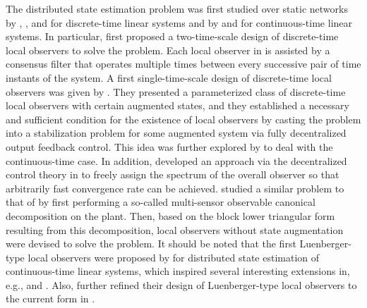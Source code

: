 \documentclass[twocolumn]{autart}
\begin{document}
The distributed state estimation problem was first studied over static networks
by \cite{Acikmese14}, \cite{ParkMartins17}, and \cite{MitraSundaram18} for discrete-time linear systems
and by \cite{KimShim16} and \cite{WangMorse18} for continuous-time linear systems.
In particular, \cite{Acikmese14} first proposed a two-time-scale design of discrete-time local observers to solve the problem.
Each local observer in \cite{Acikmese14} is assisted by a consensus filter
that operates multiple times between every successive pair of time instants of the system.
A first single-time-scale design of discrete-time local observers was given by \cite{ParkMartins17}.
They presented a parameterized class of discrete-time local observers with certain augmented states,
and they established a necessary and sufficient condition for the existence of local observers
by casting the problem into a stabilization problem for some augmented system via fully decentralized output feedback control.
This idea was further explored by \cite{WangMorse18} to deal with the continuous-time case.
In addition, \cite{WangMorse18} developed an approach via the decentralized control theory in \cite{CorfmatAnderson76}
to freely assign the spectrum of the overall observer so that arbitrarily fast convergence rate can be achieved.
\cite{MitraSundaram18} studied a similar problem to that of \cite{ParkMartins17}
by first performing a so-called multi-sensor observable canonical decomposition on the plant.
Then, based on the block lower triangular form resulting from this decomposition,
local observers without state augmentation were devised to solve the problem.
It should be noted that the first Luenberger-type local observers
were proposed by \cite{KimShim16} for distributed state estimation of continuous-time linear systems,
which inspired several interesting extensions in, e.g., \cite{HanTrentelman19} and \cite{WangLiu20}.
Also, \cite{KimShim16} further refined their design of Luenberger-type local observers to the current form in \cite{KimShim20}.
\end{document}
